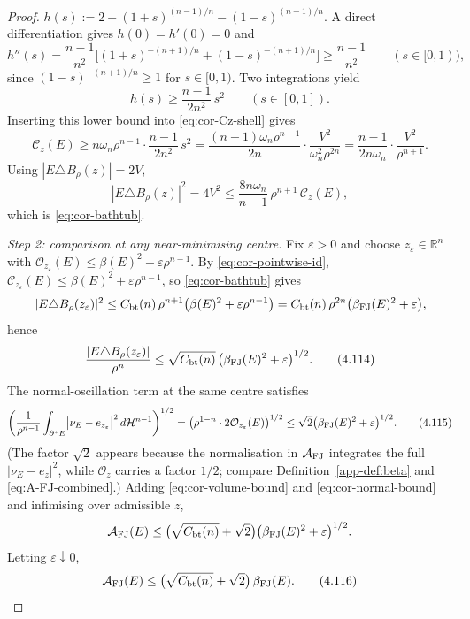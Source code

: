 \documentclass[11pt]{amsart}
\theoremstyle{definition}
\newcommand{\R}{\mathbb R}
\newcommand{\Hn}{\mathcal H^{n-1}}
\newcommand{\osc}{\mathcal O}
\begin{document}
\begin{proof}
\(h(s):=2-(1+s)^{(n-1)/n}-(1-s)^{(n-1)/n}\).  A direct
differentiation gives \(h(0)=h'(0)=0\) and
\[
   h''(s)=\frac{n-1}{n^2}
          \bigl[(1+s)^{-(n+1)/n}+(1-s)^{-(n+1)/n}\bigr]
        \ge\frac{n-1}{n^2}
   \qquad(s\in[0,1)),
\]
since \((1-s)^{-(n+1)/n}\ge1\) for \(s\in[0,1)\).  Two integrations
yield
\[
   h(s)\ge\frac{n-1}{2n^2}\,s^2
   \qquad(s\in[0,1]).
\]
Inserting this lower bound into \eqref{eq:cor-Cz-shell} gives
\[
   \mathcal C_z(E)
   \ge n\omega_n\rho^{n-1}\cdot\frac{n-1}{2n^2}\,s^2
   =\frac{(n-1)\omega_n\rho^{n-1}}{2n}\cdot
        \frac{V^2}{\omega_n^2\rho^{2n}}
   =\frac{n-1}{2n\omega_n}\cdot\frac{V^2}{\rho^{n+1}}.
\]
Using \(|E\triangle B_\rho(z)|=2V\),
\[
   |E\triangle B_\rho(z)|^2=4V^2
   \le\frac{8n\omega_n}{n-1}\,\rho^{n+1}\,\mathcal C_z(E),
\]
which is \eqref{eq:cor-bathtub}.

\smallskip
\noindent\emph{Step 2: comparison at any near-minimising centre.}
Fix \(\varepsilon>0\) and choose \(z_\varepsilon\in\R^n\) with
\(\osc_{z_\varepsilon}(E)\le\beta(E)^2+\varepsilon\rho^{n-1}\).  By
\eqref{eq:cor-pointwise-id},
\(\mathcal C_{z_\varepsilon}(E)\le\beta(E)^2+\varepsilon\rho^{n-1}\), so
\eqref{eq:cor-bathtub} gives
\[
   |E\triangle B_\rho(z_\varepsilon)|^2
   \le C_{\rm bt}(n)\,\rho^{n+1}
       \bigl(\beta(E)^2+\varepsilon\rho^{n-1}\bigr)
   =C_{\rm bt}(n)\,\rho^{2n}
       \bigl(\beta_{\rm FJ}(E)^2+\varepsilon\bigr),
\]
hence
\begin{equation}\label{eq:cor-volume-bound}
   \frac{|E\triangle B_\rho(z_\varepsilon)|}{\rho^n}
   \le\sqrt{C_{\rm bt}(n)}\,
        \bigl(\beta_{\rm FJ}(E)^2+\varepsilon\bigr)^{1/2}.
\tag{4.114}
\end{equation}
The normal-oscillation term at the same centre satisfies
\begin{equation}\label{eq:cor-normal-bound}
   \left(\frac1{\rho^{n-1}}
         \int_{\partial^*E}\bigl|\nu_E-e_{z_\varepsilon}\bigr|^2\,d\Hn
   \right)^{1/2}
   =\bigl(\rho^{1-n}\cdot 2\osc_{z_\varepsilon}(E)\bigr)^{1/2}
   \le\sqrt{2}\bigl(\beta_{\rm FJ}(E)^2+\varepsilon\bigr)^{1/2}.
\tag{4.115}
\end{equation}
(The factor \(\sqrt{2}\) appears because the normalisation in
\(\mathcal A_{\rm FJ}\) integrates the full \(|\nu_E-e_z|^2\), while
\(\osc_z\) carries a factor \(1/2\); compare
Definition~\ref{app-def:beta} and \eqref{eq:A-FJ-combined}.)
Adding \eqref{eq:cor-volume-bound} and \eqref{eq:cor-normal-bound} and
infimising over admissible \(z\),
\[
   \mathcal A_{\rm FJ}(E)
   \le\bigl(\sqrt{C_{\rm bt}(n)}+\sqrt{2}\bigr)
        \bigl(\beta_{\rm FJ}(E)^2+\varepsilon\bigr)^{1/2}.
\]
Letting \(\varepsilon\downarrow0\),
\begin{equation}\label{eq:cor-AFJ-by-beta}
   \mathcal A_{\rm FJ}(E)
   \le\bigl(\sqrt{C_{\rm bt}(n)}+\sqrt{2}\bigr)\,\beta_{\rm FJ}(E).
\tag{4.116}
\end{equation}


\end{proof}
\end{document}
